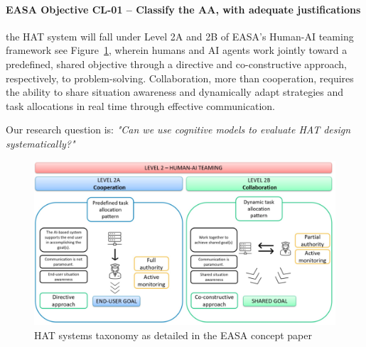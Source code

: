 \documentclass[12pt,a4paper]{article} %
\begin{document}
	\paragraph{EASA Objective CL-01 -- Classify the AA, with adequate justifications} the HAT system will fall under Level 2A and 2B of EASA's Human-AI teaming framework see Figure~\ref{fig:easa-taxo}, wherein humans and AI agents work jointly toward a predefined, shared objective through a directive and co-constructive approach, respectively, to problem-solving. Collaboration, more than cooperation, requires the ability to share situation awareness and dynamically adapt strategies and task allocations in real time through effective communication. 

	Our research question is: \textit{"Can we use cognitive models to evaluate HAT design systematically?"}

	\begin{figure}[H]
		\centering
		\includegraphics[width=1.0\textwidth]{./images/easa_taxo.png}
		\caption{HAT systems taxonomy as detailed in the EASA concept paper \parencite{easa_guidance_2024}}
		\label{fig:easa-taxo}
	\end{figure}
	
\end{document}
